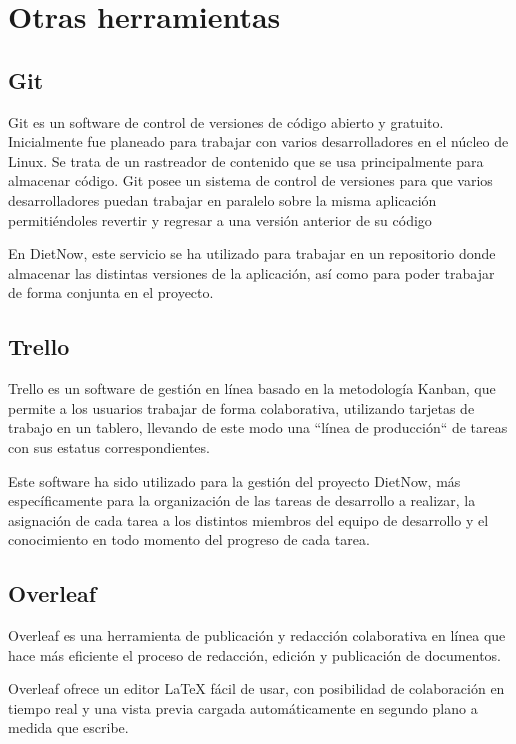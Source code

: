 \section{Otras herramientas}
\subsection{Git}
Git \cite{git} es un software de control de versiones de código abierto y gratuito. Inicialmente fue planeado para trabajar con varios desarrolladores en el núcleo de Linux. Se trata de un rastreador de contenido que se usa principalmente para almacenar código. Git posee un sistema de control de versiones para que varios desarrolladores puedan trabajar en paralelo sobre la misma aplicación permitiéndoles revertir y regresar a una versión anterior de su código

En DietNow, este servicio se ha utilizado para trabajar en un repositorio donde almacenar las distintas versiones de la aplicación, así como para poder trabajar de forma conjunta en el proyecto.

\subsection{Trello}
Trello \cite{trello} es un software de gestión en línea basado en la metodología Kanban, que permite a los usuarios trabajar de forma colaborativa, utilizando tarjetas de trabajo en un tablero, llevando de este modo una ``línea de producción`` de tareas con sus estatus correspondientes.

Este software ha sido utilizado para la gestión del proyecto DietNow, más específicamente para la organización de las tareas de desarrollo a realizar, la asignación de cada tarea a los distintos miembros del equipo de desarrollo y el conocimiento en todo momento del progreso de cada tarea. 

\subsection{Overleaf}
Overleaf \cite{overleaf} es una herramienta de publicación y redacción colaborativa en línea que hace más eficiente el proceso de redacción, edición y publicación de documentos.

Overleaf ofrece un editor \LaTeX \hspace{0.5mm} fácil de usar, con posibilidad de colaboración en tiempo real y una vista previa cargada automáticamente en segundo plano a medida que escribe.

